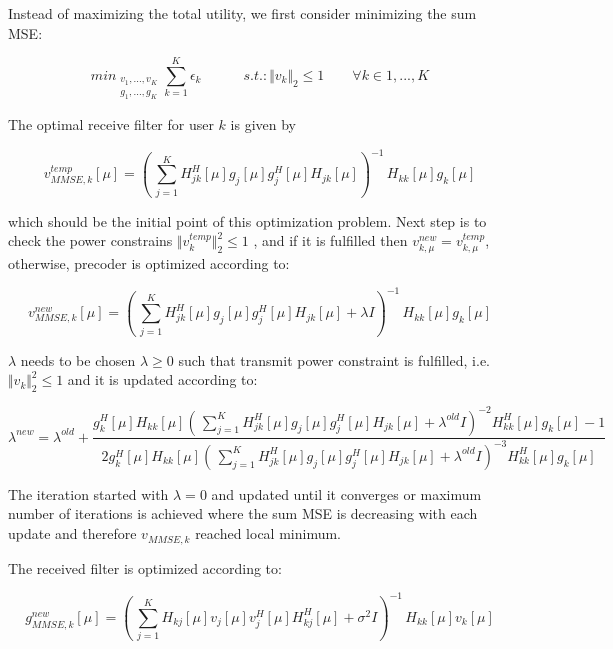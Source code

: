 \documentclass[12pt,a4paper,notitlepage,twoside,headsepline]{scrartcl}
\begin{document}
Instead of maximizing the total utility, we first consider minimizing the sum MSE:

\begin{equation}
	min_{\substack{v_1,...,v_K \\ g_1,...,g_K}} \sum_{k=1}^{K}{\epsilon_k}	\quad\quad\quad
	s.t.: \Vert v_k \Vert_2 \leq 1 \quad\quad \forall k \in {1,...,K}
\end{equation}

The optimal receive filter for user $k$ is given by

\begin{equation}
	v_{MMSE, k}^{temp}[\mu] = ( \, \sum_{j=1}^{K}{H_{jk}^{H}[\mu] g_j[\mu] g_j^H[\mu] H_{jk}[\mu]})^{-1} \, H_{kk}[\mu] g_k[\mu]
\end{equation}

which should be the initial point of this optimization problem. Next step is to check the power constrains $  \Vert v_k^{temp} \Vert_2^2  \leq 1$ , and if it is fulfilled then $ v_{k,\mu}^{new} = v_{k,\mu}^{temp}$, otherwise, precoder is optimized according to:

\begin{equation}
	v_{MMSE, k}^{new}[\mu] = ( \, \sum_{j=1}^{K}{H_{jk}^{H}[\mu] g_j[\mu] g_j^H[\mu] H_{jk}[\mu] + \lambda I})^{-1} \, H_{kk}[\mu] g_k[\mu]
\end{equation}

$\lambda$ needs to be chosen $ \lambda \geq 0 $ such that transmit power constraint is fulfilled, i.e. $ \Vert v_k \Vert_2^2  \leq 1$ and it is updated according to:

\begin{equation}
	\lambda^{new} = \lambda^{old} + \frac{g_k^H[\mu] H_{kk}[\mu] ( \, \sum_{j=1}^{K}{H_{jk}^{H}[\mu] g_j[\mu] g_j^H[\mu] H_{jk}[\mu] + \lambda^{old} I})^{-2} H_{kk}^H [\mu] g_k[\mu] - 1}{2g_k^H[\mu] H_{kk}[\mu] ( \, \sum_{j=1}^{K}{H_{jk}^{H}[\mu] g_j[\mu] g_j^H[\mu] H_{jk}[\mu] + \lambda^{old} I})^{-3} H_{kk}^H [\mu] g_k[\mu]}
\end{equation}

The iteration started with $\lambda = 0$ and updated until it converges or maximum number of iterations is achieved where the sum MSE is decreasing with each update and therefore $v_{MMSE,k}$ reached local minimum.

The received filter is optimized according to:

\begin{equation}
	g_{MMSE, k}^{new}[\mu] = ( \, \sum_{j=1}^{K}{H_{kj}[\mu] v_j[\mu] v_j^H[\mu] H_{kj}^H[\mu] + \sigma^2 I})^{-1} \, H_{kk}[\mu] v_k[\mu]
\end{equation}
\end{document}
